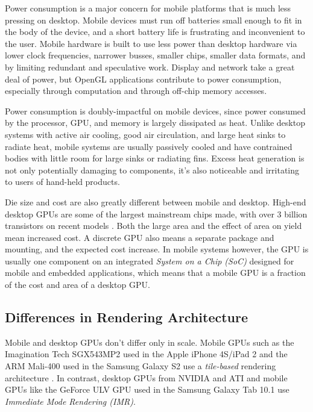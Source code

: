 Power consumption is a major concern for mobile platforms that is much less
pressing on desktop.  Mobile devices must run off batteries small enough to fit
in the body of the device, and a short battery life is frustrating and
inconvenient to the user.  Mobile hardware is built to use less power than
desktop hardware via lower clock frequencies, narrower busses, smaller chips,
smaller data formats, and by limiting redundant and speculative work.  Display
and network take a great deal of power, but OpenGL applications contribute to
power consumption, especially through computation and through off-chip memory
accesses.

Power consumption is doubly-impactful on mobile devices, since power consumed
by the processor, GPU, and memory is largely dissipated as heat.  Unlike
desktop systems with active air cooling, good air circulation, and large heat
sinks to radiate heat, mobile systems are usually passively cooled and have
contrained bodies with little room for large sinks or radiating fins.  Excess
heat generation is not only potentially damaging to components, it's also
noticeable and irritating to users of hand-held products.

Die size and cost are also greatly different between mobile and desktop.
High-end desktop GPUs are some of the largest mainstream chips made, with over
3 billion transistors on recent models \cite{Walton10}.  Both the large area
and the effect of area on yield mean increased cost.  A discrete GPU also means
a separate package and mounting, and the expected cost increase.  In mobile
systems however, the GPU is usually one component on an integrated
\textit{System on a Chip (SoC)} designed for mobile and embedded applications,
which means that a mobile GPU is a fraction of the cost and area of a desktop
GPU.

\subsection{Differences in Rendering Architecture}
\label{Jon-McCaffrey:differences-in-rendering-architecture}
  Mobile and desktop GPUs don't
differ only in scale.  Mobile GPUs such as the Imagination Tech SGX543MP2 used
in the Apple iPhone 4S/iPad 2 and the ARM Mali-400 used in the Samsung Galaxy S2
use a \textit{tile-based} rendering architecture \cite{Klug11a}.  In
contrast, desktop GPUs from NVIDIA and ATI and mobile GPUs like the
GeForce ULV GPU used in the Samsung Galaxy Tab 10.1 use \textit{Immediate Mode
Rendering (IMR)}.

